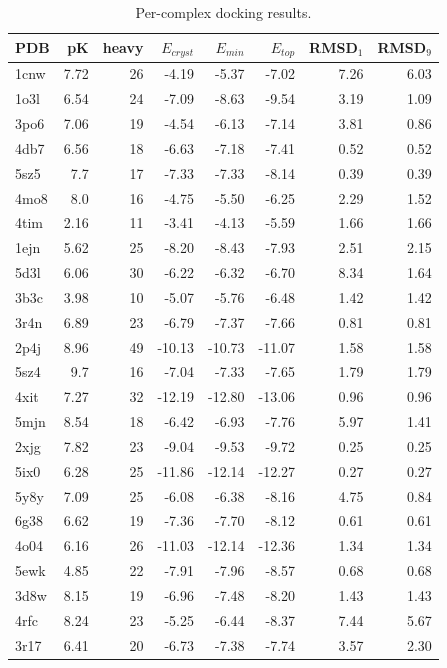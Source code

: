 {\scriptsize\begin{longtable}{lrrrrrrr}\caption{Per-complex docking results.}\\\hline PDB & pK & heavy & $E_{cryst}$ & $E_{min}$ & $E_{top}$ & RMSD$_1$ & RMSD$_{9}$\\\hline\endhead
1cnw & 7.72 & 26 & -4.19 & -5.37 & -7.02 & 7.26 & 6.03\\
1o3l & 6.54 & 24 & -7.09 & -8.63 & -9.54 & 3.19 & 1.09\\
3po6 & 7.06 & 19 & -4.54 & -6.13 & -7.14 & 3.81 & 0.86\\
4db7 & 6.56 & 18 & -6.63 & -7.18 & -7.41 & 0.52 & 0.52\\
5sz5 & 7.7 & 17 & -7.33 & -7.33 & -8.14 & 0.39 & 0.39\\
4mo8 & 8.0 & 16 & -4.75 & -5.50 & -6.25 & 2.29 & 1.52\\
4tim & 2.16 & 11 & -3.41 & -4.13 & -5.59 & 1.66 & 1.66\\
1ejn & 5.62 & 25 & -8.20 & -8.43 & -7.93 & 2.51 & 2.15\\
5d3l & 6.06 & 30 & -6.22 & -6.32 & -6.70 & 8.34 & 1.64\\
3b3c & 3.98 & 10 & -5.07 & -5.76 & -6.48 & 1.42 & 1.42\\
3r4n & 6.89 & 23 & -6.79 & -7.37 & -7.66 & 0.81 & 0.81\\
2p4j & 8.96 & 49 & -10.13 & -10.73 & -11.07 & 1.58 & 1.58\\
5sz4 & 9.7 & 16 & -7.04 & -7.33 & -7.65 & 1.79 & 1.79\\
4xit & 7.27 & 32 & -12.19 & -12.80 & -13.06 & 0.96 & 0.96\\
5mjn & 8.54 & 18 & -6.42 & -6.93 & -7.76 & 5.97 & 1.41\\
2xjg & 7.82 & 23 & -9.04 & -9.53 & -9.72 & 0.25 & 0.25\\
5ix0 & 6.28 & 25 & -11.86 & -12.14 & -12.27 & 0.27 & 0.27\\
5y8y & 7.09 & 25 & -6.08 & -6.38 & -8.16 & 4.75 & 0.84\\
6g38 & 6.62 & 19 & -7.36 & -7.70 & -8.12 & 0.61 & 0.61\\
4o04 & 6.16 & 26 & -11.03 & -12.14 & -12.36 & 1.34 & 1.34\\
5ewk & 4.85 & 22 & -7.91 & -7.96 & -8.57 & 0.68 & 0.68\\
3d8w & 8.15 & 19 & -6.96 & -7.48 & -8.20 & 1.43 & 1.43\\
4rfc & 8.24 & 23 & -5.25 & -6.44 & -8.37 & 7.44 & 5.67\\
3r17 & 6.41 & 20 & -6.73 & -7.38 & -7.74 & 3.57 & 2.30\\

\end{longtable}}
